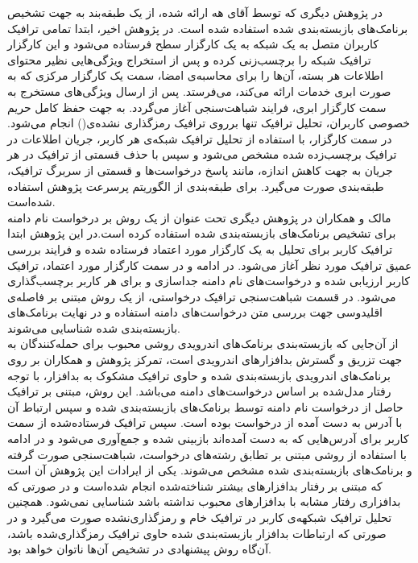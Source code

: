 در پژوهش دیگری که توسط آقای هه ارا‌ئه‌ شده‌، از یک طبقه‌بند به جهت تشخیص برنامک‌های بازبسته‌بندی شده استفاده شده است. در پژوهش اخیر، ابتدا تمامی ترافیک کاربران متصل به یک شبکه به یک کارگزار سطح فرستاده می‌شود و این کارگزار ترافیک شبکه را برچسب‌زنی‌ کرده و پس از استخراج ویژگی‌هایی نظیر محتوای‌ اطلاعات هر بسته، آن‌ها را برای محاسبه‌ی امضا، سمت یک کارگزار مرکزی که به صورت ابری‌ خدمات ارائه می‌کند، می‌فرستد. پس از ارسال ویژگی‌های مستخرج به سمت کارگزار ابری، فرایند شباهت‌سنجی آغاز می‌گردد. به جهت حفظ کامل حریم خصوصی کاربران، تحلیل ترافیک تنها برروی ترافیک رمز‌گذاری نشده‌ی() انجام می‌شود. در سمت کارگزار، با استفاده از تحلیل ترافیک شبکه‌‌ی هر کاربر، جریان اطلاعات در ترافیک برچسب‌زده شده مشخص می‌شود و سپس با حذف قسمتی از ترافیک در هر جریان به جهت کاهش اندازه، مانند پاسخ درخواست‌ها‌ و قسمتی از سربرگ‌ ترافیک، طبقه‌بندی صورت می‌گیرد. برای طبقه‌بندی از الگوریتم پرسرعت پژوهش  استفاده شده‌است.
\\
مالک و همکاران در پژوهش دیگری تحت عنوان  از یک روش  بر درخواست نام دامنه‌ برای تشخیص برنامک‌‌های بازبسته‌بندی شده استفاده کرده است.در این پژوهش ابتدا ترافیک کاربر برای تحلیل به یک کارگزار مورد اعتماد فرستاده شده و فرایند بررسی عمیق ترافیک مورد نظر آغاز می‌شود. در ادامه و در سمت کارگزار مورد اعتماد، ترافیک کاربر ارزیابی شده و درخواست‌های نام دامنه جداسازی و برای هر کاربر برچسب‌گذاری می‌شود. در قسمت شباهت‌سنجی ترافیک درخواستی، از یک روش مبتنی بر فاصله‌ی اقلیدوسی جهت بررسی متن درخواست‌های دامنه استفاده و در نهایت برنامک‌‌های بازبسته‌بندی شده شناسایی می‌شوند.
\\
از آن‌جایی که بازبسته‌بندی برنامک‌های اندرویدی روشی محبوب برای حمله‌کنندگان به جهت تزریق و گسترش بدافزار‌های اندرویدی است، تمرکز          پژوهش و همکاران بر روی برنامک‌های اندرویدی بازبسته‌بندی شده و حاوی ترافیک مشکوک به بدافزار، با توجه رفتار مدل‌شده بر اساس درخواست‌های دامنه می‌باشد. این روش، مبتنی بر ترافیک حاصل از درخواست نام دامنه توسط برنامک‌های بازبسته‌بندی شده و سپس ارتباط آن با آدرس به دست آمده از درخواست بوده‌ است. سپس ترافیک فرستاده‌شده از سمت کاربر برای آدرس‌هایی که به دست آمده‌اند بازبینی شده و جمع‌آوری می‌شود و در ادامه با استفاده از روشی مبتنی بر تطابق رشته‌های‌ درخواست، شباهت‌سنجی صورت گرفته و برنامک‌های بازبسته‌بندی شده مشخص می‌شوند. یکی از ایرادات این پژوهش آن است که مبتنی بر رفتار بدافزار‌های بیشتر شناخته‌شده انجام شده‌است و در صورتی که بدافزاری رفتار مشابه با بدافزار‌های محبوب نداشته باشد شناسایی نمی‌شود. همچنین تحلیل ترافیک شبکهه‌ی کاربر در ترافیک خام و رمزگذاری‌نشده صورت می‌گیرد و در صورتی که ارتباطات بدافزار بازبسته‌بندی شده حاوی ترافیک رمز‌گذاری‌شده باشد، آن‌گاه روش پیشنهادی در تشخیص آن‌ها ناتوان خواهد بود.\\
